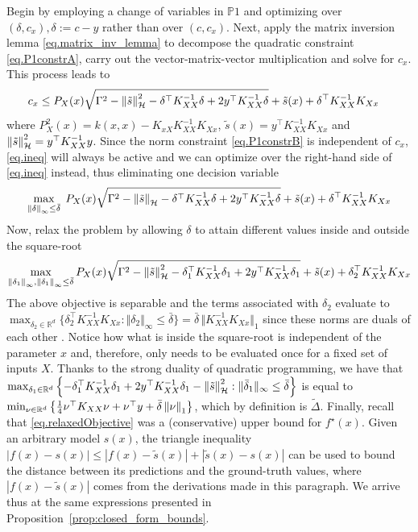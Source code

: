 Begin by employing a change of variables in $\mathds{P}1$ and optimizing over $(\delta, c_x), \delta := c - y$ rather than over $(c , c_x)$. Next, apply the matrix inversion lemma \eqref{eq.matrix_inv_lemma} to decompose the quadratic constraint \eqref{eq.P1constrA}, carry out the vector-matrix-vector multiplication and solve for $c_x$. This process leads to
\begin{equation}
	\begin{aligned}
		c_x  \leq \;&  P_X(x) \sqrt{ \Gamma^2 - \left\| \tilde s \right\|_\mathcal{H}^2 - \delta^\top K_{XX}^{-1}\delta +2y^\top K_{XX}^{-1}\delta} +\tilde s(x) 
		+ \delta^\top K_{XX}^{-1}K_{Xx}
	\end{aligned}	
	\label{eq.ineq}
\end{equation}
where $P_X^2(x) = k(x,x) - K_{xX} K_{XX}^{-1} K_{Xx}$, $\tilde{s}(x) = y^\top K_{XX}^{-1} K_{Xx}$ and $\left\| \tilde s \right\|_\mathcal{H}^2 = y^\top K_{XX}^{-1} y$. Since the norm constraint \eqref{eq.P1constrB} is independent of $c_x$, \eqref{eq.ineq} will always be active and we can optimize over the right-hand side of \eqref{eq.ineq} instead, thus eliminating one decision variable
\begin{equation}
	\max_{\left\| \delta \right\|_\infty \leq \bar \delta}\; P_X(x) \sqrt{ \Gamma^2 - \left\| \tilde s \right\|_\mathcal{H} - \delta^\top K_{XX}^{-1}\delta +2y^\top K_{XX}^{-1}\delta} + \tilde s(x) + \delta^\top K_{XX}^{-1}K_{Xx} 
\end{equation}
Now, relax the problem by allowing $\delta$ to attain different values inside and outside the square-root
	\begin{equation}
		\max_{\left\| \delta_1 \right\|_\infty,\left\| \delta_1 \right\|_\infty \leq \bar\delta} P_X(x) \sqrt{ \Gamma^2 - \left\| \tilde s \right\|_\mathcal{H}^2 - \delta_1^\top K_{XX}^{-1}\delta_1 +2y^\top K_{XX}^{-1}\delta_1} + \tilde s(x) + \delta_2^\top K_{XX}^{-1}K_{Xx}  \label{eq.relaxedObjective}
	\end{equation}
The above objective is separable and the terms associated with $\delta_2$ evaluate to $\max_{\delta_2 \in \mathbb{R}^d} \{ \delta_2^\top K_{XX}^{-1}K_{Xx} : \Vert \delta_2 \Vert_\infty \leq \bar\delta \} = \bar{\delta} \, \Vert K_{XX}^{-1}K_{Xx} \Vert_1$ since these norms are duals of each other \citep[§A.1.6]{boyd2004convex}. Notice how what is inside the square-root is independent of the parameter $x$ and, therefore, only needs to be evaluated once for a fixed set of inputs $X$. Thanks to the strong duality of quadratic programming, we have that $\max_{\delta_1 \in \mathbb{R}^d} \left\{ -\delta_1^\top K_{XX}^{-1}\delta_1 + 2y^\top K_{XX}^{-1}\delta_1 - \left\| \tilde s \right\|_\mathcal{H}^2 : \Vert \bar\delta_1 \Vert_\infty \leq \bar\delta \right\}$  is equal to $\min_{\nu \in \mathbb{R}^d} \left\{ \frac{1}{4}\nu^\top K_{XX}\nu + \nu^\top y + \bar{\delta} \left\| \nu \right\|_1\right\}$, which by definition is $\tilde \Delta$.
Finally, recall that \eqref{eq.relaxedObjective} was a (conservative) upper bound for $f^\star(x)$. Given an arbitrary model $s(x)$, the triangle inequality $|f(x) - s(x)| \leq |f(x) - \tilde s(x)| + |\tilde s(x) - s(x)|$ can be used to bound the distance between its predictions and the ground-truth values, where $|f(x) - \tilde s(x)|$ comes from the derivations made in this paragraph. We arrive thus at the same expressions presented in Proposition~\ref{prop:closed_form_bounds}.

